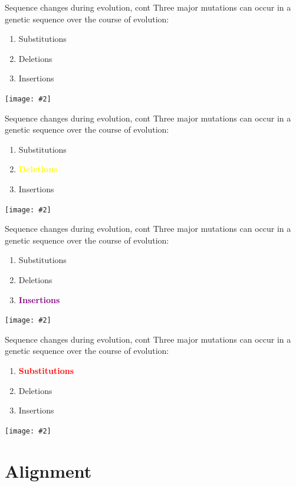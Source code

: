 \documentclass{beamer}
\renewcommand{\c}[1]{\begin{center}#1\end{center}}
\newcommand{\red}[1]{\textcolor{red}{\textbf{#1}}}
\newcommand{\yel}[1]{\textcolor{yellow}{\textbf{#1}}}
\newcommand{\prp}[1]{\textcolor{purple}{\textbf{#1}}}
\newcommand{\gr}[2][.95]{\c{\texttt{[image: \#2]}}}
\begin{document}
\begin{frame}{Sequence changes during evolution, cont}
Three major mutations can occur in a genetic sequence over the course of evolution:
\begin{enumerate}
    \item Substitutions
    \item Deletions
    \item Insertions
\end{enumerate}
\gr{l3_figs/s10_tree.png}
\end{frame}

\begin{frame}{Sequence changes during evolution, cont}
Three major mutations can occur in a genetic sequence over the course of evolution:
\begin{enumerate}
    \item Substitutions
    \item \yel{Deletions}
    \item Insertions
\end{enumerate}
\gr{l3_figs/s11_tree.png}
\end{frame}

\begin{frame}{Sequence changes during evolution, cont}
Three major mutations can occur in a genetic sequence over the course of evolution:
\begin{enumerate}
    \item Substitutions
    \item Deletions
    \item \prp{Insertions}
\end{enumerate}
\gr{l3_figs/s12_tree.png}
\end{frame}

\begin{frame}{Sequence changes during evolution, cont}
Three major mutations can occur in a genetic sequence over the course of evolution:
\begin{enumerate}
    \item \red{Substitutions}
    \item Deletions
    \item Insertions
\end{enumerate}
\gr{l3_figs/s13_tree.png}
\end{frame}

\section{Alignment}
\end{document}
